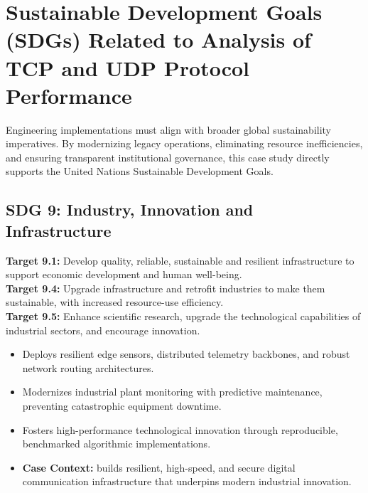 \section{Sustainable Development Goals (SDGs) Related to Analysis of TCP and UDP Protocol Performance}
Engineering implementations must align with broader global sustainability imperatives. By modernizing legacy operations, eliminating resource inefficiencies, and ensuring transparent institutional governance, this case study directly supports the United Nations Sustainable Development Goals.

\subsection{SDG 9: Industry, Innovation and Infrastructure}
\noindent\textbf{Target 9.1:} Develop quality, reliable, sustainable and resilient infrastructure to support economic development and human well-being. \\
\noindent\textbf{Target 9.4:} Upgrade infrastructure and retrofit industries to make them sustainable, with increased resource-use efficiency. \\
\noindent\textbf{Target 9.5:} Enhance scientific research, upgrade the technological capabilities of industrial sectors, and encourage innovation.
\begin{itemize}
  \item Deploys resilient edge sensors, distributed telemetry backbones, and robust network routing architectures.
  \item Modernizes industrial plant monitoring with predictive maintenance, preventing catastrophic equipment downtime.
  \item Fosters high-performance technological innovation through reproducible, benchmarked algorithmic implementations.
  \item \textbf{Case Context:} builds resilient, high-speed, and secure digital communication infrastructure that underpins modern industrial innovation.
\end{itemize}

